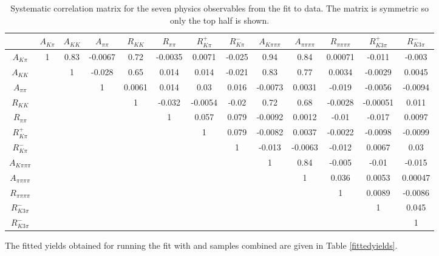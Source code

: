 \begin{table}
\centering
{\footnotesize
\begin{tabular}{c|cccccccccccc} 
\hline 
& $A_{K\pi}$ & $A_{KK}$ & $A_{\pi\pi}$ & $R_{KK}$ & $R_{\pi\pi}$ & $R^+_{K\pi}$ & $R^-_{K\pi}$ & $A_{K\pi\pi\pi}$ & $A_{\pi\pi\pi\pi}$ & $R_{\pi\pi\pi\pi}$ & $R^+_{K3\pi}$ & $R^-_{K3\pi}$ \\ 
 \hline
$A_{K\pi}$ & 1 & 0.83  & -0.0067  & 0.72  & -0.0035  & 0.0071  & -0.025  & 0.94  & 0.84  & 0.00071  & -0.011  & -0.003  \\
$A_{KK}$ &  & 1  & -0.028  & 0.65  & 0.014  & 0.014  & -0.021  & 0.83  & 0.77  & 0.0034  & -0.0029  & 0.0045  \\
$A_{\pi\pi}$ &  &  & 1  & 0.0061  & 0.014  & 0.03  & 0.016  & -0.0073  & 0.0031  & -0.019  & -0.0056  & -0.0094  \\
$R_{KK}$ & & & & 1  & -0.032  & -0.0054  & -0.02  & 0.72  & 0.68  & -0.0028  & -0.00051  & 0.011  \\
$R_{\pi\pi}$ & & & &  & 1  & 0.057  & 0.079  & -0.0092  & 0.0012  & -0.01  & -0.017  & 0.0097  \\
$R^+_{K\pi}$ & & & & &  & 1  & 0.079  & -0.0082  & 0.0037  & -0.0022  & -0.0098  & -0.0099  \\
$R^-_{K\pi}$ & & & & & &  & 1  & -0.013  & -0.0063  & -0.012  & 0.0067  & 0.03  \\
$A_{K\pi\pi\pi}$ & & & & & & &   & 1  & 0.84  & -0.005  & -0.01  & -0.015  \\
$A_{\pi\pi\pi\pi}$ & & & & & & & &   & 1  & 0.036  & 0.0053  & 0.00047  \\
$R_{\pi\pi\pi\pi}$ & & & & & & & & &   & 1  & 0.0089  & -0.0086  \\
$R^-_{K3\pi}$ & & & & & & & & & &   & 1  & 0.045  \\
$R^-_{K3\pi}$ & & & & & & & & & & &   & 1  \\
\hline 
\end{tabular}}
\caption{Systematic correlation matrix for the seven physics observables from the \CP fit to data. The matrix is symmetric so only the top half is shown.}
\label{systematiccorrelations}
\end{table}

The fitted yields obtained for running the fit with \Bp and \Bm samples combined are given in Table \ref{fittedyields}. 

